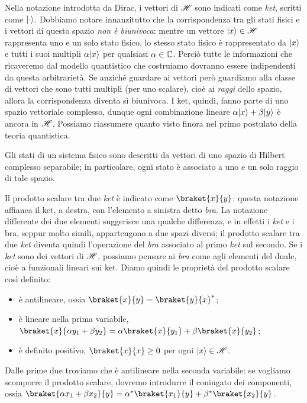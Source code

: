 Nella notazione introdotta da Dirac, i vettori di $\mathscr H$ sono indicati come \emph{ket}, scritti come $\lvert\cdot\rangle$.
Dobbiamo notare innanzitutto che la corrispondenza tra gli stati fisici e i vettori di questo spazio \emph{non è biunivoca}: mentre un vettore $\lvert x\rangle\in\mathscr H$ rappresenta uno e un solo stato fisico, lo stesso stato fisico è rappresentato da $\lvert x\rangle$ e tutti i suoi multipli $\alpha\lvert x\rangle$ per qualsiasi $\alpha\in\mathbb{C}$.
Perciò tutte le informazioni che ricaveremo dal modello quantistico che costruiamo dovranno essere indipendenti da questa arbitrarietà.
Se anzich\'e guardare ai vettori però guardiamo alla classe di vettori che sono tutti multipli (per uno scalare), cioè ai \emph{raggi} dello spazio, allora la corrispondenza diventa s\`i biunivoca.
I ket, quindi, fanno parte di uno spazio vettoriale complesso, dunque ogni combinazione lineare $\alpha\lvert x\rangle+\beta\lvert y\rangle$ è ancora in $\mathscr H$.
Possiamo riassumere quanto visto finora nel primo postulato della teoria quantistica.
\begin{postulato}
    Gli stati di un sistema fisico sono descritti da vettori di uno spazio di Hilbert complesso separabile; in particolare, ogni stato è associato a uno e un solo raggio di tale spazio.
\end{postulato}
Il prodotto scalare tra due \emph{ket} è indicato come $\braket{x}{y}$: questa notazione affianca il ket, a destra, con l'elemento a sinistra detto \emph{bra}.
La notazione differente dei due elementi suggerisce una qualche differenza, e in effetti i \emph{ket} e i bra, seppur molto simili, appartengono a due spazi diversi; il prodotto scalare tra due \emph{ket} diventa quindi l'operazione del \emph{bra} associato al primo \emph{ket} sul secondo.
Se i \emph{ket} sono dei vettori di $\mathscr H$, possiamo pensare ai \emph{bra} come agli elementi del duale, cioè a funzionali lineari sui ket.
Diamo quindi le proprietà del prodotto scalare cos\`i definito:
\begin{itemize}
	\item è antilineare, ossia $\braket{x}{y}=\braket{y}{x}^*$;
	\item è lineare nella prima variabile, $\braket{x}{\alpha y_1+\beta y_2}=\alpha\braket{x}{y_1}+\beta\braket{x}{y_2}$;
	\item è definito positivo, $\braket{x}{x}\geq 0$ per ogni $\lvert x\rangle\in\mathscr H$.
\end{itemize}
Dalle prime due troviamo che è antilineare nella seconda variabile: se vogliamo scomporre il prodotto scalare, dovremo introdurre il coniugato dei componenti, ossia $\braket{\alpha x_1+\beta x_2}{y}=\alpha^*\braket{x_1}{y}+\beta^*\braket{x_2}{y}$.
